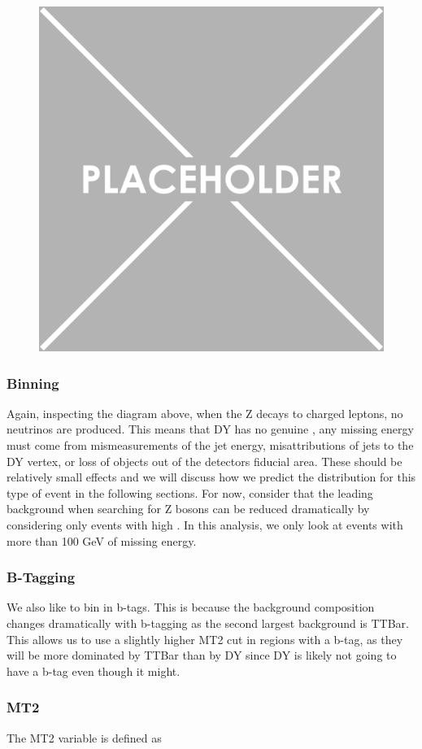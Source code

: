       \begin{figure}[h!]
        \centering
        \includegraphics[width=.5\textwidth]{figures/placeholder.png}
        \caption{}
        \label{fig:DY-diagram}
      \end{figure}

    \subsubsection{\MET Binning}
      Again, inspecting the diagram above, when the Z decays to charged leptons, no neutrinos are produced. This means that DY has no genuine \MET, any missing energy must come from mismeasurements of the jet energy, misattributions of jets to the DY vertex, or loss of objects out of the detectors fiducial area. These should be relatively small effects and we will discuss how we predict the \MET distribution for this type of event in the following sections. For now, consider that the leading background when searching for Z bosons can be reduced dramatically by considering only events with high \MET. In this analysis, we only look at events with more than 100 GeV of missing energy.

    \subsubsection{B-Tagging}
      We also like to bin in b-tags. This is because the background composition changes dramatically with b-tagging as the second largest background is TTBar. This allows us to use a slightly higher MT2 cut in regions with a b-tag, as they will be more dominated by TTBar than by DY since DY is likely not going to have a b-tag even though it might.

    \subsubsection{MT2}
      The MT2 variable is defined as

